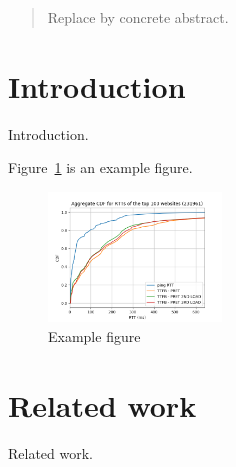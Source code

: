 \documentclass[twocolumn, 10pt, conference]{IEEEtran}
\begin{document}

\setlength{\belowdisplayskip}{10pt} \setlength{\belowdisplayshortskip}{10pt}
\setlength{\abovedisplayskip}{10pt} \setlength{\abovedisplayshortskip}{10pt}
\setlength{\textfloatsep}{10pt plus 1.0pt minus 2.0pt}
\setlength{\floatsep}{10pt plus 1.0pt minus 2.0pt}
\setlength{\intextsep}{10pt plus 1.0pt minus 2.0pt}

\begin{abstract}
Replace by concrete abstract.
\end{abstract}


\section{Introduction}
\label{sec:introduction}



Introduction.

Figure~\ref{fig:example} is an example figure.

\begin{figure}[t]
\centering
    \includegraphics[width=0.41\textwidth]{fig/aggregategraph}
     \caption{Example figure}
      \label{fig:example}
\end{figure}

\section{Related work}
\label{sec:related-work}
Related work.
\end{document}
